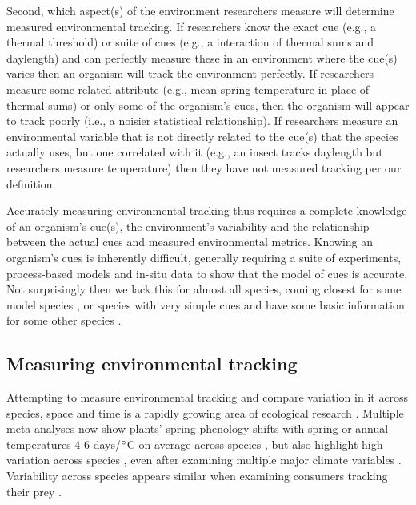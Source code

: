 \documentclass[11pt,letterpaper]{article}
\begin{document}
Second, which aspect(s) of the environment researchers measure will determine measured environmental tracking. If researchers know the exact cue (e.g., a thermal threshold) or suite of cues (e.g., a interaction of thermal sums and daylength) and can perfectly measure these in an environment where the cue(s) varies then an organism will track the environment perfectly. If researchers measure some related attribute (e.g., mean spring temperature in place of thermal sums) or only some of the organism's cues, then the organism will appear to track poorly (i.e., a noisier statistical relationship).  If researchers measure an environmental variable that is not directly related to the cue(s) that the species actually uses, but one correlated with it (e.g., an insect tracks daylength but researchers measure temperature) then they have not measured tracking per our definition.

Accurately measuring environmental tracking thus requires a complete knowledge of an organism's cue(s), the environment's variability and the relationship between the actual cues and measured environmental metrics. Knowing an organism's cues is inherently difficult, generally requiring a suite of experiments, process-based models and in-situ data to show that the model of cues is accurate. Not surprisingly then we lack this for almost all species, coming closest for some model species \citep[e.g., \emph{Arabidopsis thaliana},][]{Kingsolver2007,Wilczek:2009oa}, or species with very simple cues \citep[e.g., coral \emph{Acropora millepora},][]{levy2007} and have some basic information for some other species \citep[e.g., the Great Tit, \emph{Parus major},][]{charm2008}. 

\subsection{Measuring environmental tracking}
Attempting to measure environmental tracking and compare variation in it across species, space and time is a rapidly growing area of ecological research \citep[e.g.,][]{Cook:2012pnas,fu2015,thackeray2016,cohen2018}. Multiple meta-analyses now show plants' spring phenology shifts with spring or annual temperatures 4-6 days/$\degree$C on average across species \citep{Richardson:2006qh,Wolkovich:2012n,thackeray2016}, but also highlight high variation across species  \citep{Cook:2012pnas}, even after examining multiple major climate variables \citep{thackeray2016}. Variability across species appears similar when examining consumers tracking their prey \citep[across diverse species tracking over time is 6.1 days/decade but ranges from zero to 15 days/decade, see][]{kharouba2018}. 
\end{document}
